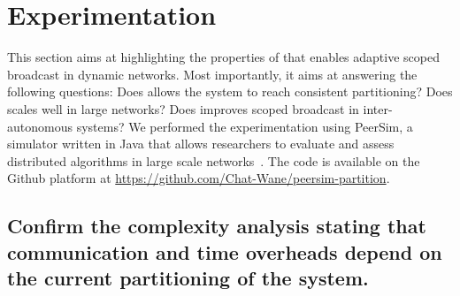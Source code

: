 
\section{Experimentation}
\label{sec:experimentation}

This section aims at highlighting the properties of \NAME that enables
adaptive scoped broadcast in dynamic networks. Most importantly, it
aims at answering the following questions: Does \NAME allows the
system to reach consistent partitioning? Does \NAME scales well in
large networks? Does \NAME improves scoped broadcast in
inter-autonomous systems?  We performed the
experimentation using PeerSim, a simulator written in Java that allows
researchers to evaluate and assess distributed algorithms in large
scale networks~\cite{montresor2009peersim}. The code is available on
the Github platform at
\url{https://github.com/Chat-Wane/peersim-partition}.

\subsection{Confirm the complexity analysis stating that
  communication and time overheads depend on the current partitioning
  of the system.}

